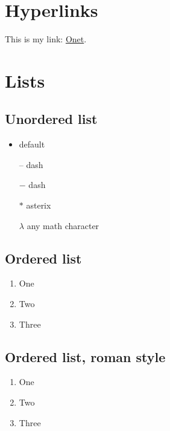 \documentclass{article}
\begin{document}
    

    \newpage

    \section{Hyperlinks}

    This is my link: \href{http://www.onet.pl}{Onet}.

    \newpage

    \section{Lists}
    
    \subsection{Unordered list}

    \begin{itemize}
        \item default
        \item[--] dash
        \item[$-$] dash
        \item[$\ast$] asterix 
        \item[$\lambda$] any math character
    \end{itemize}

    \subsection{Ordered list}

    \begin{enumerate}
        \item One
        \item Two
        \item Three
    \end{enumerate}

    \subsection{Ordered list, roman style}

    \begin{enumerate}[label=(\roman*)]
        \item One
        \item Two
        \item Three
    \end{enumerate}
\end{document}

